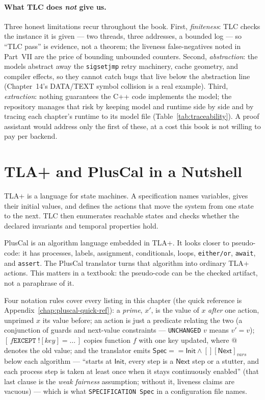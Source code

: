 \paragraph{What TLC does \emph{not} give us.}  Three honest limitations recur
throughout the book.  First, \emph{finiteness}: TLC checks the instance it is
given --- two threads, three addresses, a bounded log --- so ``TLC pass'' is
evidence, not a theorem; the liveness false-negatives noted in
Part~VII are the price of bounding unbounded counters.  Second,
\emph{abstraction}: the models abstract away the \texttt{sigsetjmp} retry
machinery, cache geometry, and compiler effects, so they cannot catch bugs
that live below the abstraction line (Chapter~14's DATA/TEXT symbol collision
is a real example).  Third, \emph{extraction}: nothing guarantees the C++ code
implements the model; the repository manages that risk by keeping model and
runtime side by side and by tracing each chapter's runtime to its model file
(Table~\ref{tab:traceability}).  A proof assistant would address only the first
of these, at a cost this book is not willing to pay per backend.

\section{TLA+ and PlusCal in a Nutshell}

TLA+ is a language for state machines.  A specification names variables, gives
their initial values, and defines the actions that move the system from one
state to the next.  TLC then enumerates reachable states and checks whether the
declared invariants and temporal properties hold.

PlusCal is an algorithm language embedded in TLA+.  It looks closer to
pseudo-code: it has processes, labels, assignment, conditionals, loops,
\texttt{either/or}, \texttt{await}, and \texttt{assert}.  The PlusCal translator
turns that algorithm into ordinary TLA+ actions.  This matters in a textbook:
the pseudo-code can be the checked artifact, not a paraphrase of it.

Four notation rules cover every listing in this chapter (the quick reference
is Appendix~\ref{chap:pluscal-quick-ref}): a \emph{prime}, $x'$, is the value
of $x$ \emph{after} one action, unprimed $x$ its value before; an action is
just a predicate relating the two (a conjunction of guards and next-value
constraints --- \texttt{UNCHANGED} $v$ means $v' = v$);
$[\,f \mathbin{\texttt{EXCEPT}}\; ![\mathit{key}] = \dots\,]$ copies function
$f$ with one key updated, where $@$ denotes the old value; and the translator
emits $\mathsf{Spec} == \mathsf{Init} \wedge [][\mathsf{Next}]_\mathit{vars}$
below each algorithm --- ``starts at $\mathsf{Init}$, every step is a
$\mathsf{Next}$ step or a stutter, and each process step is taken at least
once when it stays continuously enabled'' (that last clause is the
\emph{weak fairness} assumption; without it, liveness claims are vacuous) ---
which is what \texttt{SPECIFICATION Spec} in a configuration file names.

